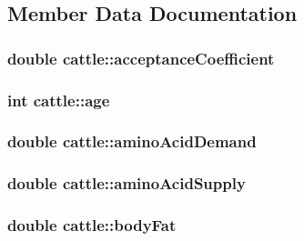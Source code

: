 \subsection{Member Data Documentation}
\hypertarget{classcattle_a54c41c4168fa7a8bf51dbab9c79c9b61}{
\subsubsection[{acceptanceCoefficient}]{\setlength{\rightskip}{0pt plus 5cm}double {\bf cattle::acceptanceCoefficient}}}
\label{classcattle_a54c41c4168fa7a8bf51dbab9c79c9b61}
\hypertarget{classcattle_abffa75c5af0af11f66f1217329dc71b2}{
\subsubsection[{age}]{\setlength{\rightskip}{0pt plus 5cm}int {\bf cattle::age}}}
\label{classcattle_abffa75c5af0af11f66f1217329dc71b2}
\hypertarget{classcattle_abd8875c6b64433fd2dbd14593c8bd961}{
\subsubsection[{aminoAcidDemand}]{\setlength{\rightskip}{0pt plus 5cm}double {\bf cattle::aminoAcidDemand}}}
\label{classcattle_abd8875c6b64433fd2dbd14593c8bd961}
\hypertarget{classcattle_ad77f647e607efacadcec9aa8ef82de2c}{
\subsubsection[{aminoAcidSupply}]{\setlength{\rightskip}{0pt plus 5cm}double {\bf cattle::aminoAcidSupply}}}
\label{classcattle_ad77f647e607efacadcec9aa8ef82de2c}
\hypertarget{classcattle_ace40244cf83a23b5a874f5f0185807fa}{
\subsubsection[{bodyFat}]{\setlength{\rightskip}{0pt plus 5cm}double {\bf cattle::bodyFat}}}

